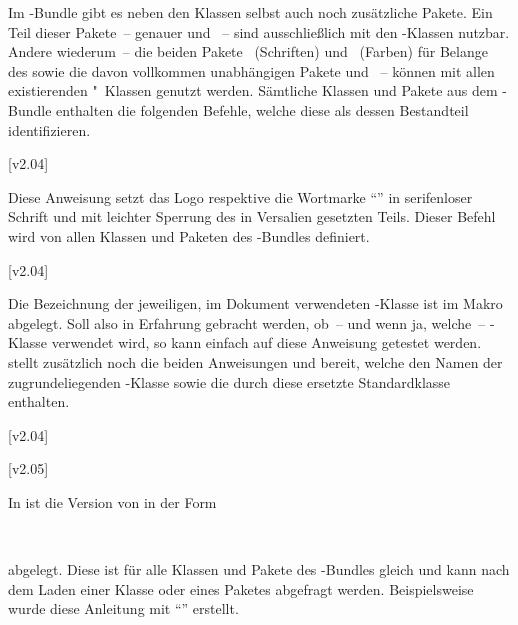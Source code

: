 \begin{Entity}{}
Im \TUDScript-Bundle gibt es neben den Klassen selbst auch noch zusätzliche 
Pakete. Ein Teil dieser Pakete~-- genauer  und 
~-- sind ausschließlich mit den \TUDScript-Klassen nutzbar.
Andere wiederum~-- die beiden Pakete ~(Schriften) und 
~(Farben) für Belange des \CDs sowie die davon vollkommen 
unabhängigen Pakete  und ~-- können mit 
allen existierenden "~Klassen genutzt werden. Sämtliche 
Klassen und Pakete aus dem \TUDScript-Bundle enthalten die folgenden Befehle, 
welche diese als dessen Bestandteil identifizieren.

\begin{Declaration}
  {}
  [v2.04]
\printdeclarationlist

Diese Anweisung setzt das Logo respektive die Wortmarke \enquote{\TUDScript{}} 
in serifenloser Schrift und mit leichter Sperrung des in Versalien gesetzten 
Teils. Dieser Befehl wird von allen Klassen und Paketen des \TUDScript-Bundles 
definiert.
\end{Declaration}

\begin{Declaration}
  {}
  [v2.04]
\printdeclarationlist

Die Bezeichnung der jeweiligen, im Dokument verwendeten \TUDScript-Klasse ist 
im Makro  abgelegt. Soll also in Erfahrung gebracht 
werden, ob~-- und wenn ja, welche~-- \TUDScript-Klasse verwendet wird, so kann 
einfach auf diese Anweisung getestet werden. \KOMAScript stellt zusätzlich 
noch die beiden Anweisungen  und  
bereit, welche den Namen der zugrundeliegenden \KOMAScript-Klasse sowie die 
durch diese ersetzte Standardklasse enthalten.
\end{Declaration}

\begin{Declaration}
  {}
  [v2.04]
\begin{Declaration}
  {}
  [v2.05]
\printdeclarationlist

In  ist die Version von \TUDScript in der Form
\begin{quoting}
~~
\end{quoting}
abgelegt. Diese ist für alle Klassen und Pakete des \TUDScript-Bundles gleich 
und kann nach dem Laden einer Klasse oder eines Paketes abgefragt werden. 
Beispielsweise wurde diese Anleitung mit \enquote{\TUDScriptVersion} erstellt.


\end{Declaration}
\end{Declaration}
\end{Entity}
